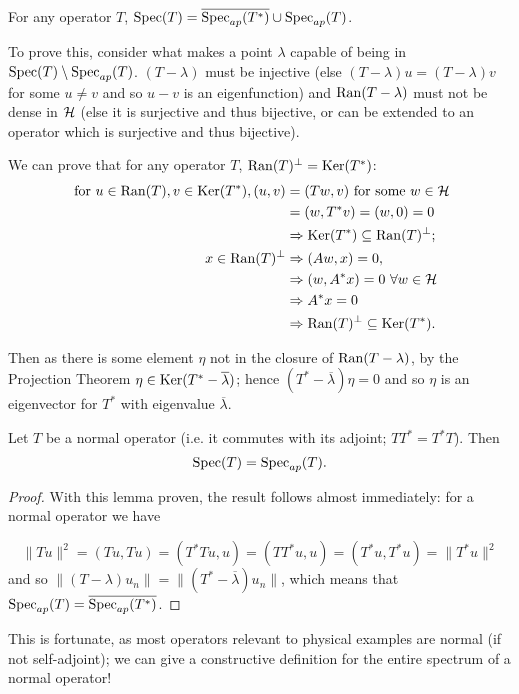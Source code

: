 \documentclass[../main.tex]{subfiles}
\begin{document}
\begin{lemma}
For any operator $T$, $\mathrm{Spec}(T) = \overline{\mathrm{Spec}_{ap} (T^*)} \cup \mathrm{Spec}_{ap} (T)$.
\end{lemma}
To prove this, consider what makes a point $\lambda$ capable of being in $\mathrm{Spec}(T) \setminus \mathrm{Spec}_{ap}(T)$. $(T - \lambda)$ must be injective (else $(T - \lambda)u = (T - \lambda)v$ for some $u \neq v$ and so $u-v$ is an eigenfunction) and $\mathrm{Ran}(T - \lambda)$ must not be dense in $\mathcal{H}$ (else it is surjective and thus bijective, or can be extended to an operator which is surjective and thus bijective).

We can prove that for any operator $T$, $\mathrm{Ran}(T)^\perp = \mathrm{Ker}(T^*)$:
\begin{align*}
\text{ for } u \in \mathrm{Ran}(T), v \in \mathrm{Ker}(T^*), (u, v) & = (Tw, v) \text{ for some $w \in \mathcal{H}$} \\
& = (w, T^*v) = (w, 0) = 0 \\
& \Rightarrow \mathrm{Ker}(T^*) \subseteq \mathrm{Ran}(T)^\perp ;\\
x \in \mathrm{Ran}(T)^\perp & \Rightarrow (Aw, x) = 0, \\
& \Rightarrow (w, A^*x) = 0\ \forall w \in \mathcal{H} \\
&  \Rightarrow A^*x = 0 \\
& \Rightarrow \mathrm{Ran}(T)^\perp \subseteq \mathrm{Ker}(T^*).
\end{align*}

Then as there is some element $\eta$ not in the closure of  $\mathrm{Ran}(T - \lambda)$, by the Projection Theorem $\eta \in \mathrm{Ker}(T^* - \overline{\lambda})$; hence $(T^* - \overline{\lambda})\eta = 0$ and so $\eta$ is an eigenvector for $T^*$ with eigenvalue $\overline{\lambda}.$

\begin{theorem}\label{thm:normal-spec} \cite{halmos1982hilbert}
Let $T$ be a normal operator (i.e. it commutes with its adjoint; $TT^* = T^*T$). Then $$\mathrm{Spec}(T) = \mathrm{Spec}_{ap}(T).$$
\end{theorem}
\begin{proof}
With this lemma proven, the result follows almost immediately: for a normal operator we have

$$\|Tu\|^2 = (Tu, Tu) = (T^*Tu, u) = (TT^*u, u) = (T^*u, T^*u) = \|T^*u\|^2$$
and so $\|(T - \lambda)u_n\| = \|(T^* - \overline{\lambda})u_n\|$,
which means that $\mathrm{Spec}_{ap}(T) = \overline{\mathrm{Spec}_{ap} (T^*)}$. 
\end{proof}

This is fortunate, as most operators relevant to physical examples are normal (if not self-adjoint); we can give a constructive definition for the entire spectrum of a normal operator!
\end{document}

